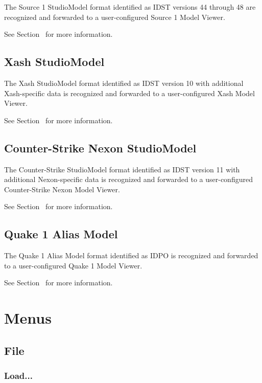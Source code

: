 \documentclass[10pt, a4paper, titlepage, oneside]{article}
\begin{document}
The Source 1 StudioModel format identified as IDST versions 44 through 48 are recognized and forwarded to a user-configured Source 1 Model Viewer.

See Section~ for more information.

\subsection{Xash StudioModel}

The Xash StudioModel format identified as IDST version 10 with additional Xash-specific data is recognized and forwarded to a user-configured Xash Model Viewer.

See Section~ for more information.

\subsection{Counter-Strike Nexon StudioModel}

The Counter-Strike StudioModel format identified as IDST version 11 with additional Nexon-specific data is recognized and forwarded to a user-configured Counter-Strike Nexon Model Viewer.

See Section~ for more information.

\subsection{Quake 1 Alias Model}

The Quake 1 Alias Model format identified as IDPO is recognized and forwarded to a user-configured Quake 1 Model Viewer.

See Section~ for more information.

\newpage

\section{Menus}

\subsection{File}

\subsubsection{Load...}
\end{document}
